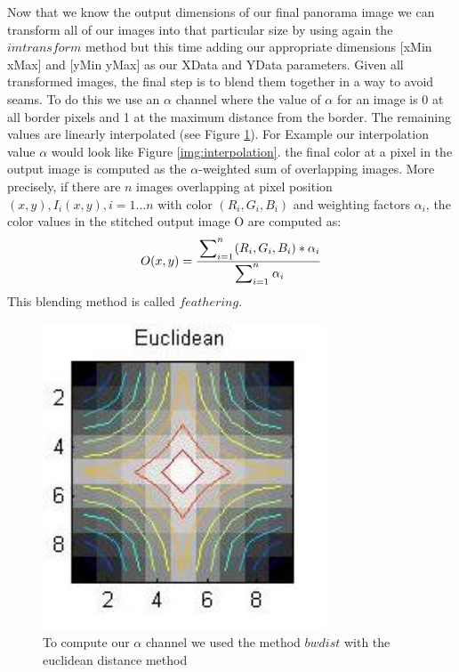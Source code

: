 \documentclass[subfigure,epsfig,fleqn,float,numbers=noenddot]{scrartcl}
\begin{document}
Now that we know the output dimensions of our final panorama image we can transform all of our images into that particular size by using again the $imtransform$ method but this time adding our appropriate dimensions [xMin xMax] and [yMin yMax] as our XData and YData parameters. Given all transformed images, the final step is to blend them together in a way to avoid seams. To do this we use an $\alpha$ channel where the value of $\alpha$ for an image is 0 at all border pixels and 1 at the maximum distance from the border. The remaining values are linearly interpolated (see Figure \ref{img:bwdist}). For Example our interpolation value $\alpha$ would look like Figure \ref{img:interpolation}. the final color at a pixel in the output image is computed as the $\alpha$-weighted sum of overlapping images. More precisely, if there are $n$ images overlapping at pixel position $(x,y), I_i(x,y), i = 1...n$ with color $(R_i,G_i,B_i)$ and weighting factors $\alpha_i$, the color values in the stitched output image O are computed as:
\begin{equation*}
	O(x,y) = \frac{\sideset{}{_{i=1}^n}\sum_{} (R_i,G_i,B_i) * \alpha_i} {\sideset{}{_{i=1}^n}\sum_{} \alpha_i}
\end{equation*}
This blending method is called $feathering$.
	\begin{figure}[H]
		\centering
		\includegraphics[width=0.75\textwidth]{./img/bwdist.jpg}
		\caption{To compute our $\alpha$ channel we used the method $bwdist$ with the euclidean distance method}
		\label{img:bwdist}
	\end{figure}
\end{document}
